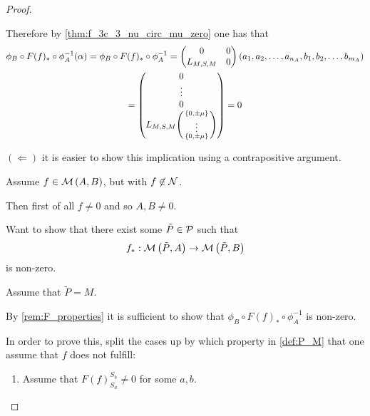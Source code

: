 \begin{proof}
\begin{enumerate}
{            Therefore by \autoref{thm:f_3c_3_nu_circ_mu_zero} one has that
            \begin{multline*}
                \phi_B \circ F(f)_* \circ \phi_A^{-1}(\alpha) =
                \phi_B \circ F(f)_* \circ \phi_A^{-1} =
                \begin{pmatrix}
                    0 & 0 \\
                    L_{M, S, M} & 0
                \end{pmatrix}
                \left( a_1, a_2, \dots, a_{n_A}, b_1, b_2, \dots, b_{m_A} \right) \\
                =
                \begin{pmatrix}
                    0 \\
                    \vdots \\
                    0 \\
                    L_{M, S, M}
                    \begin{psmallmatrix}
                        \left\{ 0, \pm \mu \right\} \\
                        \vdots \\
                        \left\{ 0, \pm \mu \right\}
                    \end{psmallmatrix}
                \end{pmatrix}
                = 0
            \end{multline*}

            \( (\Leftarrow) \) it is easier to show this implication using a contrapositive argument.

            Assume \( f \in {\mathcal{M}}\left( A, B \right) \), but with \( f \not\in {\mathcal{N}} \).

            Then first of all \( f \neq 0 \) and so \( A, B \neq 0 \).

            Want to show that there exist some \( \tilde{P} \in {\mathcal{P}} \) such that
            \[
                f_*: {\mathcal{M}}\left( \tilde{P}, A \right) \to {\mathcal{M}}\left( \tilde{P}, B \right)
            \]
            is non-zero.

            Assume that \( \tilde{P} = M \).

            By \autoref{rem:F_properties} it is sufficient to show that \( \phi_B \circ F(f)_* \circ \phi_A^{-1} \) is non-zero.

            In order to prove this, split the cases up by which property in \autoref{def:P_M} that one assume that \( f \) does not fulfill:
            \begin{enumerate}
                \item {
                    Assume that \( F(f)_{S_a}^{S_b} \neq 0 \) for some \( a, b \).

}
\end{enumerate}}
\end{enumerate}
\end{proof}
